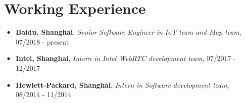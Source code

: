 \documentclass[letterpaper, UTF8]{article}
\begin{document}
	\section*{\textbf{Working Experience}}\vspace{-0.05in}
	\begin{itemize}
		\item \textbf{Baidu, Shanghai}, \emph{Senior Software Engineer in IoT team and Map team}, 07/2018 - present
		\item \textbf{Intel, Shanghai}, \emph{Intern in Intel WebRTC development team}, 07/2017 - 12/2017
		\item \textbf{Hewlett-Packard, Shanghai}, \emph{Intern in Software development team}, 08/2014 - 11/2014
	\end{itemize}
	\vspace{-0.32in}
	
\end{document}
